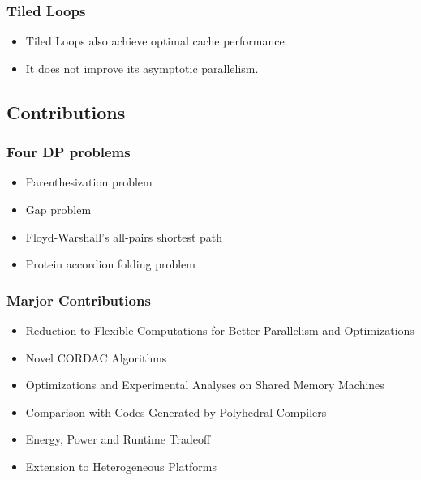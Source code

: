 \begin{frame}
    \frametitle{Tiled Loops}
	\begin{itemize}
		\item Tiled Loops also achieve optimal cache performance.
		\item It does not improve its asymptotic parallelism.
	\end{itemize}
\end{frame}

\subsection{Contributions}
\begin{frame}
    \frametitle{Four DP problems}
	\begin{itemize}
		\item Parenthesization problem
		\item Gap problem
		\item Floyd-Warshall's all-pairs shortest path
		\item Protein accordion folding problem
	\end{itemize}
\end{frame}

\begin{frame}
    \frametitle{Marjor Contributions}
	\begin{itemize}
		\item Reduction to Flexible Computations for Better Parallelism
			and Optimizations
		\item Novel CORDAC Algorithms
		\item Optimizations and Experimental Analyses on Shared Memory Machines
		\item Comparison with Codes Generated by Polyhedral Compilers
		\item Energy, Power and Runtime Tradeoff
		\item Extension to Heterogeneous Platforms
	\end{itemize}
\end{frame}
